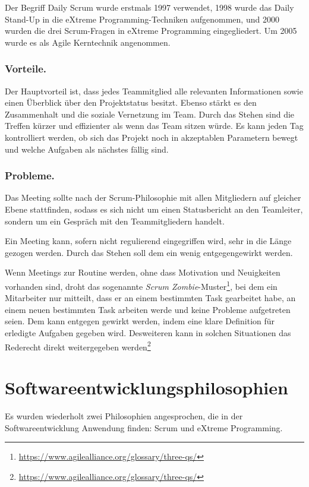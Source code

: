 		Der Begriff Daily Scrum wurde erstmals 1997 verwendet, 1998 wurde das Daily Stand-Up in die eXtreme Programming-Techniken aufgenommen, und 2000 wurden die drei Scrum-Fragen in eXtreme Programming eingegliedert.
		Um 2005 wurde es als Agile Kerntechnik angenommen.
		
		\subsubsection{Vorteile.}
			\label{sssec:daily-pro}
			Der Hauptvorteil ist, dass jedes Teammitglied alle relevanten Informationen sowie einen Überblick über den Projektstatus besitzt.
			Ebenso stärkt es den Zusammenhalt und die soziale Vernetzung im Team.
			Durch das Stehen sind die Treffen kürzer und effizienter als wenn das Team sitzen würde.
			Es kann jeden Tag kontrolliert werden, ob sich das Projekt noch in akzeptablen Parametern bewegt und welche Aufgaben als nächstes fällig sind.
			
		\subsubsection{Probleme.}
			\label{sssec:daily-con}
			Das Meeting sollte nach der Scrum-Philosophie mit allen Mitgliedern auf gleicher Ebene stattfinden, sodass es sich nicht um einen Statusbericht an den Teamleiter, sondern um ein Gespräch mit den Teammitgliedern handelt.
			
			Ein Meeting kann, sofern nicht regulierend eingegriffen wird, sehr in die Länge gezogen werden.
			Durch das Stehen soll dem ein wenig entgegengewirkt werden.
			
			Wenn Meetings zur Routine werden, ohne dass Motivation und Neuigkeiten vorhanden sind, droht das sogenannte \textit{Scrum Zombie}-Muster\footnote{
				\url{https://www.agilealliance.org/glossary/three-qs/}
			}, bei dem ein Mitarbeiter nur mitteilt, dass er an einem bestimmten Task gearbeitet habe, an einem neuen bestimmten Task arbeiten werde und keine Probleme aufgetreten seien.
			Dem kann entgegen gewirkt werden, indem eine klare Definition für erledigte Aufgaben gegeben wird.
			Desweiteren kann in solchen Situationen das Rederecht direkt weitergegeben werden\footnote{
				\url{https://www.agilealliance.org/glossary/three-qs/}
			}
			
		
\section{Softwareentwicklungsphilosophien}
	\label{sec:phil}
	Es wurden wiederholt zwei Philosophien angesprochen, die in der Softwareentwicklung Anwendung finden: Scrum und eXtreme Programming.
	
